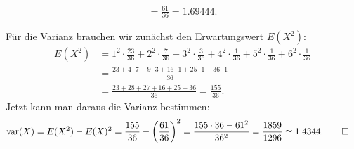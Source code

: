 \begin{loesung}
\begin{teilaufgaben}
\begin{align*}
=\frac{61}{36}=1.69444.
\end{align*}
\item
Für die Varianz brauchen wir zunächst den Erwartungswert $E(X^2)$:
\begin{align*}
E(X^2)&=
1^2\cdot\frac{23}{36}+
2^2\cdot\frac{7}{36}+
3^2\cdot\frac{3}{36}+
4^2\cdot\frac{1}{36}+
5^2\cdot\frac{1}{36}+
6^2\cdot\frac{1}{36}
\\
&=\frac{23 + 4\cdot 7 + 9\cdot 3+16\cdot 1+25\cdot 1+36\cdot 1}{36}\\
&=\frac{23 + 28 + 27 + 16+25+36}{36}
=\frac{155}{36}.
\end{align*}
Jetzt kann man daraus die Varianz bestimmen:
\begin{align*}
\operatorname{var}(X)
&=
E(X^2)-E(X)^2
=
\frac{155}{36}-\biggl(\frac{61}{36}\biggr)^2
=
\frac{155\cdot 36-61^2}{36^2}=\frac{1859}{1296}\simeq 1.4344.
\qedhere
\end{align*}
\end{teilaufgaben}
\end{loesung}


